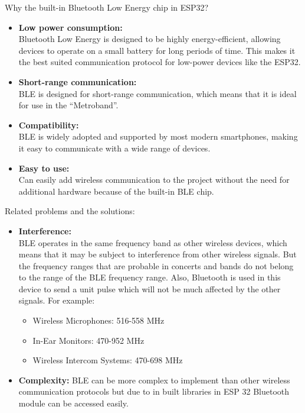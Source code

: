 \documentclass{article}
\begin{document}
        Why the built-in Bluetooth Low Energy chip in ESP32? 
        \begin{itemize}
            \item \textbf{Low power consumption:} \\
            Bluetooth Low Energy is designed to be highly energy-efficient, allowing devices to operate on a small battery for long periods of time. This makes it the best suited communication protocol for low-power devices like the ESP32.

            \item \textbf{Short-range communication:}\\ 
            BLE is designed for short-range communication, which means that it is ideal for use in the “Metroband”.

            \item \textbf{Compatibility:} \\ 
            BLE is widely adopted and supported by most modern smartphones, making it easy to communicate with a wide range of devices.

            \item \textbf{Easy to use:} \\
            Can easily add wireless communication to the project without the need for additional hardware because of the built-in BLE chip.
        \end{itemize}

        Related problems and the solutions:
        \begin{itemize}
            \item \textbf{Interference:} \\
            BLE operates in the same frequency band as other wireless devices, which means that it may be subject to interference from other wireless signals. But the frequency ranges that are probable in concerts and bands do not belong to the range of the BLE frequency range. Also, Bluetooth is used in this device to send a unit pulse which will not be much affected by the other signals. For example:
            \begin{itemize}
                \item Wireless Microphones: 516-558 MHz
                \item In-Ear Monitors: 470-952 MHz
                \item Wireless Intercom Systems: 470-698 MHz
            \end{itemize}

            \item \textbf{Complexity:} 
            BLE can be more complex to implement than other wireless communication protocols but due to in built libraries in ESP 32 Bluetooth module can be accessed easily.
        \end{itemize}
\end{document}
